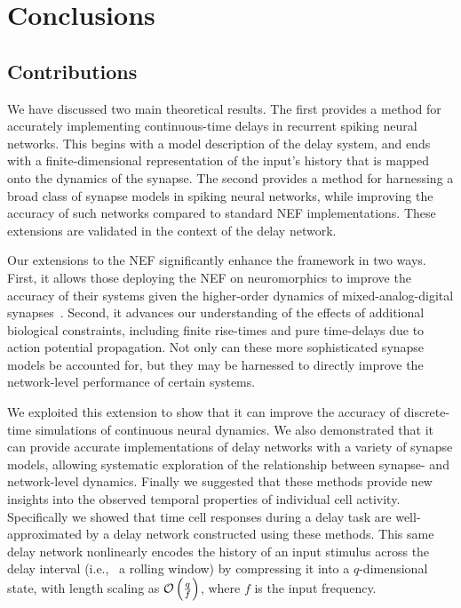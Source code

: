 \chapter{Conclusions}
\label{chapt:conclusions}

\section{Contributions}

We have discussed two main theoretical results.
The first provides a method for accurately implementing continuous-time delays in recurrent spiking neural networks.
This begins with a model description of the delay system, and ends with a finite-dimensional representation of the input's history that is mapped onto the dynamics of the synapse.
The second provides a method for harnessing a broad class of synapse models in spiking neural networks, while improving the accuracy of such networks compared to standard NEF implementations.
These extensions are validated in the context of the delay network.

Our extensions to the NEF significantly enhance the framework in two ways.
First, it allows those deploying the NEF on neuromorphics to improve the accuracy of their systems given the higher-order dynamics of mixed-analog-digital synapses~\citep{voelker2017iscas, voelker2017neuromorphic}.
Second, it advances our understanding of the effects of additional biological constraints, including finite rise-times and pure time-delays due to action potential propagation.
Not only can these more sophisticated synapse models be accounted for, but they may be harnessed to directly improve the network-level performance of certain systems.

We exploited this extension to show that it can improve the accuracy of discrete-time simulations of continuous neural dynamics.
We also demonstrated that it can provide accurate implementations of delay networks with a variety of synapse models, allowing systematic exploration of the relationship between synapse- and network-level dynamics.
Finally we suggested that these methods provide new insights into the observed temporal properties of individual cell activity.
Specifically we showed that time cell responses during a delay task are well-approximated by a delay network constructed using these methods.
This same delay network nonlinearly encodes the history of an input stimulus across the delay interval (i.e.,~ a rolling window) by compressing it into a $q$-dimensional state, with length scaling as $\mathcal{O}\left({ \frac{q}{f} }\right)$, where $f$ is the input frequency.

